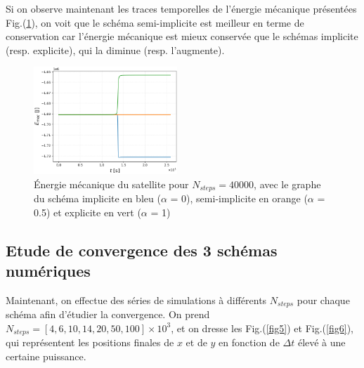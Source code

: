 \documentclass[a4paper,12pt,twoside]{article}
\begin{document}
Si on observe maintenant les traces temporelles de l'énergie mécanique présentées Fig.(\ref{fig4}), on voit que le schéma semi-implicite est meilleur en terme de conservation car l'énergie mécanique est mieux conservée que le schémas implicite (resp. explicite), qui la diminue (resp. l'augmente).




\begin{figure}[H]
    \centering
    \includegraphics[width=0.48\textwidth]{Graphes/E_mec_2.png}
    \captionsetup{justification=centering}
    \caption{Énergie mécanique du satellite pour $N_{steps} = 40000$, avec le graphe du schéma implicite en bleu ($\alpha$ = 0), semi-implicite en orange ($\alpha$ = 0.5) et explicite en vert  ($\alpha$ = 1)}
    \label{fig4}
\end{figure}

\clearpage

\subsection{Etude de convergence des 3 schémas numériques}

Maintenant, on effectue des séries de simulations à différents $N_{steps}$ pour chaque schéma afin d'étudier la convergence. On prend $N_{steps}=[4, 6, 10, 14, 20, 50, 100] \times 10^3$, et on dresse les Fig.(\ref{fig5}) et Fig.(\ref{fig6}), qui représentent les positions finales de $x$ et de $y$ en fonction de $\Delta t$ élevé à une certaine puissance.
\end{document}
